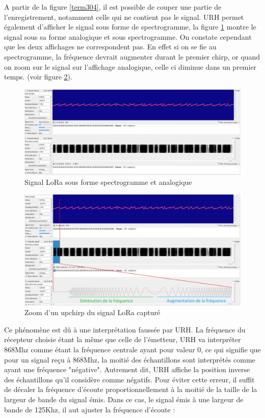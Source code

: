 A partir de la figure \ref{term304}, il est possible de couper une partie de l'enregistrement, notamment celle qui ne contient pas le signal. \ac{URH} permet également d'afficher le signal sous forme de spectrogramme, la figure \ref{term306} montre le signal sous sa forme analogique et sous spectrogramme. On constate cependant que les deux affichages ne correspondent pas. En effet si on se fie au spectrogramme, la fréquence devrait augmenter durant le premier chirp, or quand on zoom sur le signal sur l'affichage analogique, celle ci diminue dans un premier temps. (voir figure \ref{term307}).

\newpage

\begin{figure}[h]
\centering

\includegraphics[scale=0.11]{images/urh4.png}
\caption{Signal LoRa sous forme spectrogramme et analogique}\label{term306}
\end{figure}

\begin{figure}[h]
\centering

\includegraphics[scale=0.18]{images/urh5.png}
\caption{Zoom d'un upchirp du signal LoRa capturé}\label{term307}
\end{figure}

Ce phénomène est dû à une interprétation faussée par URH. La fréquence du récepteur choisie étant la même que celle de l'émetteur, \ac{URH} va interpréter 868Mhz comme étant la fréquence centrale ayant pour valeur 0, ce qui signifie que pour un signal reçu à 868Mhz, la moitié des échantillons sont interprétés comme ayant une fréquence "négative". Autrement dit, \ac{URH} affiche la position inverse des échantillons qu'il considère comme négatifs. Pour éviter cette erreur, il suffit de décaler la fréquence d'écoute proportionnellement à la moitié de la taille de la largeur de bande du signal émis. Dans ce cas, le signal émis à une largeur de bande de 125Khz, il aut ajuster la fréquence d'écoute :

